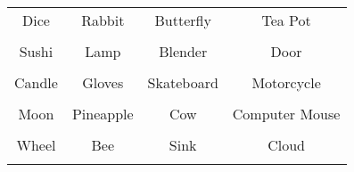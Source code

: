\documentclass[12pt,a4paper]{article}
\begin{document}
\thispagestyle{empty}
\begin{table}[]
\centering
\Huge
\begin{tabular}{cccc}
 Dice& Rabbit& Butterfly& Tea Pot\\  & & & \\
 Sushi& Lamp& Blender& Door\\  & & & \\
 Candle& Gloves& Skateboard& Motorcycle\\  & & & \\
 Moon& Pineapple& Cow& Computer Mouse\\  & & & \\
 Wheel& Bee& Sink& Cloud\\  & & & \\
\end{tabular}
\end{table}
\end{document}
